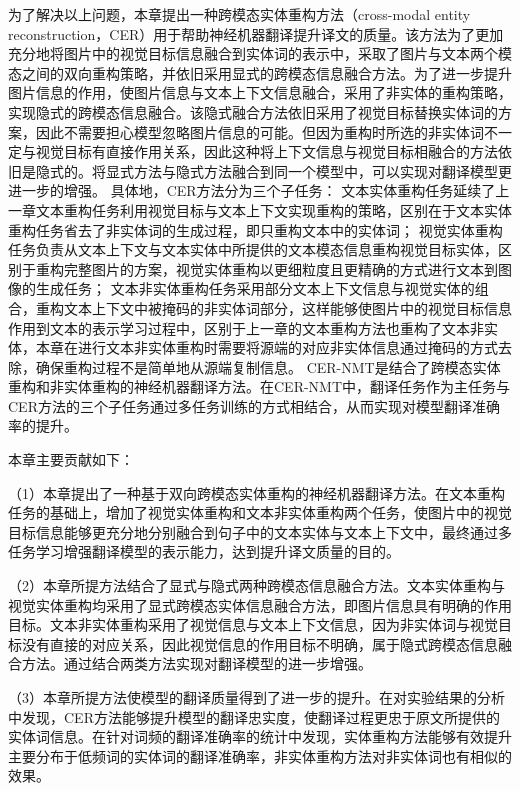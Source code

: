 为了解决以上问题，本章提出一种跨模态实体重构方法（cross-modal entity reconstruction，CER）用于帮助神经机器翻译提升译文的质量。该方法为了更加充分地将图片中的视觉目标信息融合到实体词的表示中，采取了图片与文本两个模态之间的双向重构策略，并依旧采用显式的跨模态信息融合方法。为了进一步提升图片信息的作用，使图片信息与文本上下文信息融合，采用了非实体的重构策略，实现隐式的跨模态信息融合。该隐式融合方法依旧采用了视觉目标替换实体词的方案，因此不需要担心模型忽略图片信息的可能。但因为重构时所选的非实体词不一定与视觉目标有直接作用关系，因此这种将上下文信息与视觉目标相融合的方法依旧是隐式的。将显式方法与隐式方法融合到同一个模型中，可以实现对翻译模型更进一步的增强。
具体地，CER方法分为三个子任务：
文本实体重构任务延续了上一章文本重构任务利用视觉目标与文本上下文实现重构的策略，区别在于文本实体重构任务省去了非实体词的生成过程，即只重构文本中的实体词；
视觉实体重构任务负责从文本上下文与文本实体中所提供的文本模态信息重构视觉目标实体，区别于重构完整图片的方案，视觉实体重构以更细粒度且更精确的方式进行文本到图像的生成任务；
文本非实体重构任务采用部分文本上下文信息与视觉实体的组合，重构文本上下文中被掩码的非实体词部分，这样能够使图片中的视觉目标信息作用到文本的表示学习过程中，区别于上一章的文本重构方法也重构了文本非实体，本章在进行文本非实体重构时需要将源端的对应非实体信息通过掩码的方式去除，确保重构过程不是简单地从源端复制信息。
CER-NMT是结合了跨模态实体重构和非实体重构的神经机器翻译方法。在CER-NMT中，翻译任务作为主任务与CER方法的三个子任务通过多任务训练的方式相结合，从而实现对模型翻译准确率的提升。

本章主要贡献如下：

（1）本章提出了一种基于双向跨模态实体重构的神经机器翻译方法。在文本重构任务的基础上，增加了视觉实体重构和文本非实体重构两个任务，使图片中的视觉目标信息能够更充分地分别融合到句子中的文本实体与文本上下文中，最终通过多任务学习增强翻译模型的表示能力，达到提升译文质量的目的。

（2）本章所提方法结合了显式与隐式两种跨模态信息融合方法。文本实体重构与视觉实体重构均采用了显式跨模态实体信息融合方法，即图片信息具有明确的作用目标。文本非实体重构采用了视觉信息与文本上下文信息，因为非实体词与视觉目标没有直接的对应关系，因此视觉信息的作用目标不明确，属于隐式跨模态信息融合方法。通过结合两类方法实现对翻译模型的进一步增强。

（3）本章所提方法使模型的翻译质量得到了进一步的提升。在对实验结果的分析中发现，CER方法能够提升模型的翻译忠实度，使翻译过程更忠于原文所提供的实体词信息。在针对词频的翻译准确率的统计中发现，实体重构方法能够有效提升主要分布于低频词的实体词的翻译准确率，非实体重构方法对非实体词也有相似的效果。